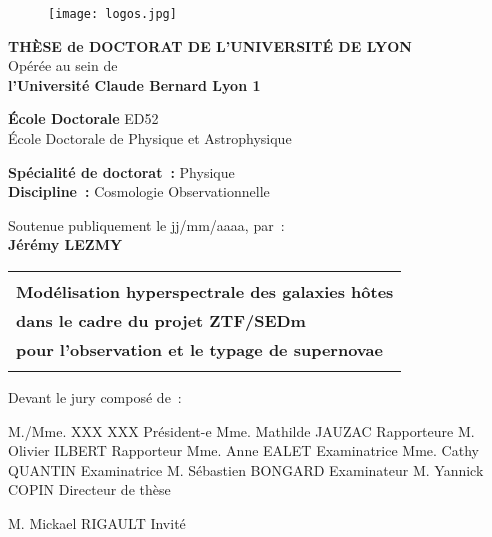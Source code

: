 \documentclass[../main/main.tex]{subfiles}
\begin{document}
\begin{titlepage}
    \begin{center}
        \begin{figure}[h]
            \centering
            \texttt{[image: logos.jpg]}
        \end{figure}

        \vfill

        {\large\bfseries THÈSE de DOCTORAT DE L'UNIVERSITÉ DE LYON\\}
        {Opérée au sein de\\}
        {\large \bfseries l'Université Claude Bernard Lyon 1\\}
        \bigbreak

        {\large \textbf{École Doctorale} ED52\\
        École Doctorale de Physique et Astrophysique}
        \bigbreak

        {\large \textbf{Spécialité de doctorat~:} Physique \\}
        {\large \textbf{Discipline~:} Cosmologie Observationnelle}

        \vfill

        {Soutenue publiquement le jj/mm/aaaa, par~:\\}
        {\Large\bfseries {Jérémy LEZMY}\\}
        \vspace{0.5cm}
        \begin{tabularx}{\linewidth}{Y}
            \toprule
            \\[0.2em]
            \Large \bfseries Modélisation hyperspectrale des galaxies hôtes \\[8pt]
            \Large \bfseries dans le cadre du projet ZTF/SEDm\\[8pt]
            \Large \bfseries pour l’observation et le typage de supernovae\\
            \\[-0.2em]
            \bottomrule
        \end{tabularx}

        \vfill

    \end{center}

\vfill

Devant le jury composé de~: \bigbreak

M./Mme. XXX XXX \hfill Président-e\smallbreak
Mme. Mathilde JAUZAC \hfill Rapporteure\smallbreak
M. Olivier ILBERT \hfill Rapporteur\smallbreak
Mme. Anne EALET  \hfill Examinatrice\smallbreak
Mme. Cathy QUANTIN  \hfill Examinatrice\smallbreak
M. Sébastien BONGARD  \hfill Examinateur\smallbreak
M. Yannick COPIN \hfill Directeur de thèse\smallbreak

M. Mickael RIGAULT \hfill Invité\smallbreak

\vfill

\end{titlepage}
\end{document}

